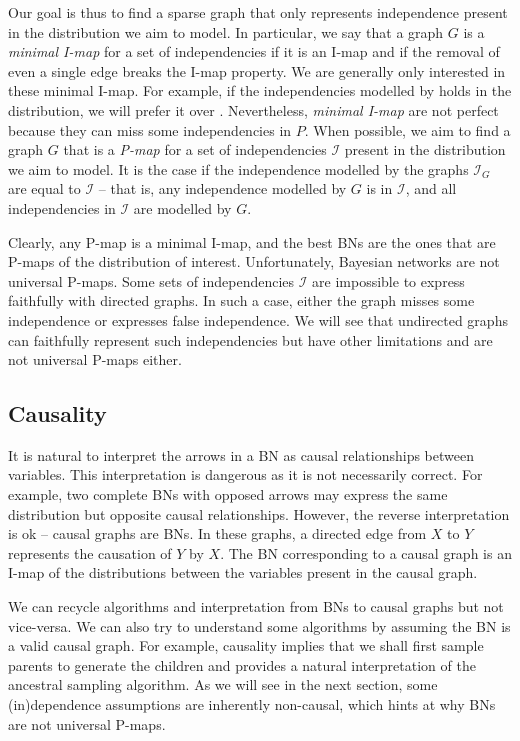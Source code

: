 Our goal is thus to find a sparse graph that only represents independence present in the distribution we aim to model. In particular, we say that a graph $G$ is a \textit{minimal I-map} for a set of independencies if it is an I-map and if the removal of even a single edge breaks the I-map property. We are generally only interested in these minimal I-map. For example, if the independencies modelled by  holds in the distribution, we will prefer it over  . Nevertheless, \textit{minimal I-map} are not perfect because they can miss some independencies in $P$.
When possible, we aim to find a graph $G$ that is a \textit{P-map} for a set of independencies $\mathcal{I}$ present in the distribution we aim to model. It is the case if the independence modelled by the graphs $\mathcal{I}_G$ are equal to $\mathcal{I}$ -- that is, any independence modelled by $G$ is in $\mathcal{I}$, and all independencies in $\mathcal{I}$ are modelled by $G$.

Clearly, any P-map is a minimal I-map, and the best BNs are the ones that are P-maps of the distribution of interest. Unfortunately, Bayesian networks are not universal P-maps. Some sets of independencies $\mathcal{I}$ are impossible to express faithfully with directed graphs. In such a case, either the graph misses some independence or expresses false independence. We will see that undirected graphs can faithfully represent such independencies but have other limitations and are not universal P-maps either.
\subsection{Causality}
It is natural to interpret the arrows in a BN as causal relationships between variables. This interpretation is dangerous as it is not necessarily correct. For example, two complete BNs with opposed arrows may express the same distribution but opposite causal relationships. However, the reverse interpretation is ok -- causal graphs are BNs. In these graphs, a directed edge from $X$ to $Y$ represents the causation of $Y$ by $X$. The BN corresponding to a causal graph is an I-map of the distributions between the variables present in the causal graph.

We can recycle algorithms and interpretation from BNs to causal graphs but not vice-versa. We can also try to understand some algorithms by assuming the BN is a valid causal graph. For example, causality implies that we shall first sample parents to generate the children and provides a natural interpretation of the ancestral sampling algorithm. As we will see in the next section, some (in)dependence assumptions are inherently non-causal, which hints at why BNs are not universal P-maps.

